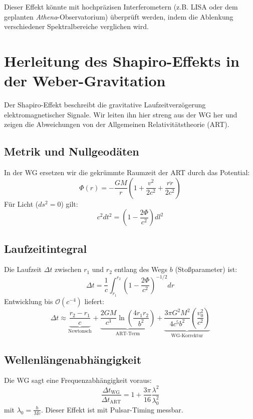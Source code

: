 Dieser Effekt könnte mit hochpräzisen Interferometern (z.B. LISA oder dem geplanten \textit{Athena}-Observatorium) überprüft werden, indem die Ablenkung verschiedener
Spektralbereiche verglichen wird.

\newpage
\section{Herleitung des Shapiro-Effekts in der Weber-Gravitation}
\label{sec:shapiro_effect_wg_dbt}

Der Shapiro-Effekt beschreibt die gravitative Laufzeitverzögerung elektromagnetischer Signale. Wir leiten ihn hier streng aus der WG her und zeigen die Abweichungen von der Allgemeinen Relativitätstheorie (ART).

\subsection{Metrik und Nullgeodäten}
In der WG ersetzen wir die gekrümmte Raumzeit der ART durch das Potential:
\begin{equation}
\Phi(r) = -\frac{GM}{r}\left(1 + \frac{v^2}{2c^2} + \frac{r\ddot{r}}{2c^2}\right)
\end{equation}
Für Licht ($ds^2 = 0$) gilt:
\begin{equation}
c^2dt^2 = \left(1 - \frac{2\Phi}{c^2}\right)dl^2
\end{equation}

\subsection{Laufzeitintegral}
Die Laufzeit $\Delta t$ zwischen $r_1$ und $r_2$ entlang des Wegs $b$ (Stoßparameter) ist:
\begin{equation}
\Delta t = \frac{1}{c}\int_{r_1}^{r_2} \left(1 - \frac{2\Phi}{c^2}\right)^{-1/2} dr
\end{equation}
Entwicklung bis $\mathcal{O}(c^{-4})$ liefert:
\begin{equation}
\Delta t \approx \underbrace{\frac{r_2 - r_1}{c}}_{\text{Newtonsch}} + \underbrace{\frac{2GM}{c^3}\ln\left(\frac{4r_1r_2}{b^2}\right)}_{\text{ART-Term}} + \underbrace{\frac{3\pi G^2M^2}{4c^5b^2}\left(\frac{v_0^2}{c^2}\right)}_{\text{WG-Korrektur}}
\end{equation}

\subsection{Wellenlängenabhängigkeit}
Die WG sagt eine Frequenzabhängigkeit voraus:
\begin{equation}
\frac{\Delta t_{\text{WG}}}{\Delta t_{\text{ART}}} = 1 + \frac{3\pi}{16}\frac{\lambda^2}{\lambda_0^2}
\end{equation}
mit $\lambda_0 = \frac{h}{Mc}$. Dieser Effekt ist mit Pulsar-Timing messbar.

